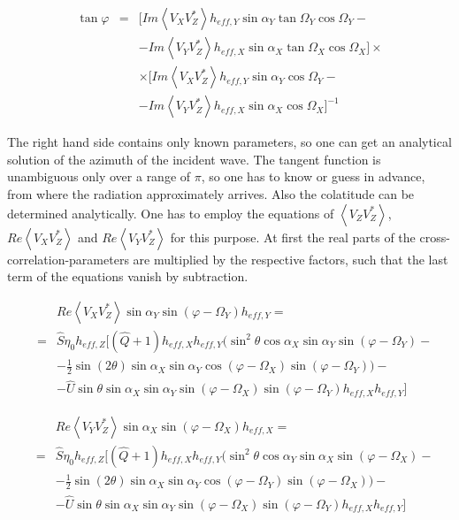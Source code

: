 \documentclass[a4paper,14pt]{extbook}
\begin{document}
\begin{eqnarray}\label{tan_phi}
\tan \varphi &=& [Im \left\langle V_X V_Z^{*}\right\rangle h_{eff,Y} \sin \alpha_Y \tan \Omega_Y \cos \Omega_Y-\\
& & -Im \left\langle V_Y V_Z^{*}\right\rangle h_{eff,X} \sin \alpha_X \tan \Omega_X \cos \Omega_X] \times \nonumber \\
& &\times[Im \left\langle V_X V_Z^{*}\right\rangle h_{eff,Y} \sin \alpha_Y \cos \Omega_Y -\nonumber \\
& &  -Im \left\langle V_Y V_Z^{*}\right\rangle h_{eff,X} \sin \alpha_X  \cos \Omega_X]^{-1}\nonumber
\end{eqnarray}

The right hand side contains only known parameters, so one can get an analytical solution of the azimuth of the incident wave. The tangent function is unambiguous only over a range of $\pi$, so one has to know or guess in advance, from where the radiation approximately arrives. Also the colatitude can be determined analytically. One has to employ the equations of $\left\langle V_Z V_Z^{*} \right\rangle$, $Re \left\langle V_X V_Z^{*}\right\rangle$ and $Re \left\langle V_Y V_Z^{*}\right\rangle$ for this purpose. At first the real parts of the cross-correlation-parameters are multiplied by the respective factors, such that the last term of the equations vanish by subtraction.

\begin{eqnarray}
&&Re \left\langle V_X V_Z^{*}\right\rangle \sin \alpha_Y  \sin (\varphi - \Omega_Y)h_{eff,Y} = \\
&=& \hat{S}\eta_0  h_{eff,Z}[(\hat{Q}+1) h_{eff,X} h_{eff,Y}
(\sin^2 \theta \cos \alpha_X  \sin \alpha_Y  \sin (\varphi - \Omega_Y) - \nonumber \\
&& - \frac{1}{2}  \sin(2\theta) \sin \alpha_X  \sin \alpha_Y \cos(\varphi - \Omega_X)  \sin (\varphi - \Omega_Y) )  - \nonumber \\
&& -\hat{U} \sin \theta \sin \alpha_X  \sin \alpha_Y  \sin (\varphi - \Omega_X)  \sin (\varphi - \Omega_Y) h_{eff,X} h_{eff,Y}  ] \nonumber
\end{eqnarray}

\begin{eqnarray}
&&Re \left\langle V_Y V_Z^{*}\right\rangle\sin \alpha_X  \sin (\varphi - \Omega_X) h_{eff,X}=  \\
&=& \hat{S}\eta_0 h_{eff,Z}[(\hat{Q}+1)h_{eff,X} h_{eff,Y}  (\sin^2 \theta \cos \alpha_Y \sin \alpha_X  \sin (\varphi - \Omega_X) -\nonumber \\
&& - \frac{1}{2}  \sin(2\theta) \sin \alpha_X \sin \alpha_Y  \cos(\varphi - \Omega_Y)  \sin (\varphi - \Omega_X))  - \nonumber \\
&& -\hat{U} \sin \theta \sin \alpha_X \sin \alpha_Y  \sin (\varphi - \Omega_X) \sin (\varphi - \Omega_Y) h_{eff,X} h_{eff,Y}    ]\nonumber
\end{eqnarray}
\end{document}
